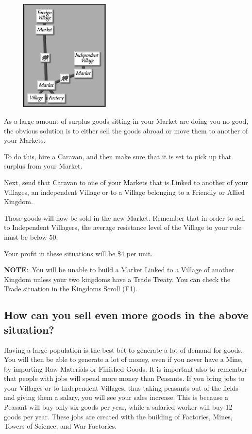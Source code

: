 \begin{figure}
	\vspace{-20pt}
	\begin{center}
		\includegraphics[width=0.4\textwidth]{Itradesit4}
	\end{center}
	\vspace{-20pt}
\end{figure}

As a large amount of surplus goods sitting in your Market are doing you no good, the obvious solution is to either sell the goods abroad or move them to another of your Markets.

To do this, hire a Caravan, and then make sure that it is set to pick up that surplus from your Market.

Next, send that Caravan to one of your Markets that is Linked to another of your Villages, an independent Village or to a Village belonging to a Friendly or Allied Kingdom.

Those goods will now be sold in the new Market. Remember that in order to sell to Independent Villagers, the average resistance level of the Village to your rule must be below 50.

Your profit in these situations will be \$4 per unit.

\textbf{NOTE}: You will be unable to build a Market Linked to a Village of another Kingdom unless your two kingdoms have a Trade Treaty. You can check the Trade situation in the Kingdoms Scroll (F1).

\subsection{How can you sell even more goods in the above situation?}

Having a large population is the best bet to generate a lot of demand for goods. You will then be able to generate a lot of money, even if you never have a Mine, by importing Raw Materials or Finished Goods. It is important also to remember that people with jobs will spend more money than Peasants. If you bring jobs to your Villages or to Independent Villages, thus taking peasants out of the fields and giving them a salary, you will see your sales increase. This is because a Peasant will buy only six goods per year, while a salaried worker will buy 12 goods per year. These jobs are created with the building of Factories, Mines, Towers of Science, and War Factories.

